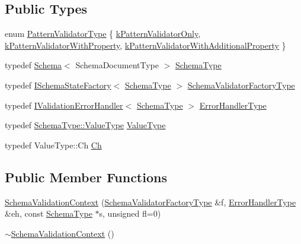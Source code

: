 \subsection*{Public Types}
\begin{DoxyCompactItemize}
\item 
enum \hyperlink{structinternal_1_1SchemaValidationContext_a4fb1b8fe7ecb9d4608e6b0ac0716826c}{Pattern\+Validator\+Type} \{ \hyperlink{structinternal_1_1SchemaValidationContext_a4fb1b8fe7ecb9d4608e6b0ac0716826ca54cca82af0ef391404c2a930187ce5e9}{k\+Pattern\+Validator\+Only}, 
\hyperlink{structinternal_1_1SchemaValidationContext_a4fb1b8fe7ecb9d4608e6b0ac0716826ca2514cf806ce8e41993907d57d3732435}{k\+Pattern\+Validator\+With\+Property}, 
\hyperlink{structinternal_1_1SchemaValidationContext_a4fb1b8fe7ecb9d4608e6b0ac0716826ca39a21b8fcd048ddaabe29bc11e08c8f8}{k\+Pattern\+Validator\+With\+Additional\+Property}
 \}
\item 
typedef \hyperlink{classinternal_1_1Schema}{Schema}$<$ Schema\+Document\+Type $>$ \hyperlink{structinternal_1_1SchemaValidationContext_a79b155ab3711b97b6e33ced450614397}{Schema\+Type}
\item 
typedef \hyperlink{classinternal_1_1ISchemaStateFactory}{I\+Schema\+State\+Factory}$<$ \hyperlink{structinternal_1_1SchemaValidationContext_a79b155ab3711b97b6e33ced450614397}{Schema\+Type} $>$ \hyperlink{structinternal_1_1SchemaValidationContext_a33fa91fd8e880d1adb9b891fe441f110}{Schema\+Validator\+Factory\+Type}
\item 
typedef \hyperlink{classinternal_1_1IValidationErrorHandler}{I\+Validation\+Error\+Handler}$<$ \hyperlink{structinternal_1_1SchemaValidationContext_a79b155ab3711b97b6e33ced450614397}{Schema\+Type} $>$ \hyperlink{structinternal_1_1SchemaValidationContext_a4d015d68e8957c254b84af5f3550b2f3}{Error\+Handler\+Type}
\item 
typedef \hyperlink{classinternal_1_1Schema_a8976b6d7e2a885483d0b51d941019340}{Schema\+Type\+::\+Value\+Type} \hyperlink{structinternal_1_1SchemaValidationContext_acc134e808d3a4dbe8834eb1a3e98e816}{Value\+Type}
\item 
typedef Value\+Type\+::\+Ch \hyperlink{structinternal_1_1SchemaValidationContext_abd905cd1513b117f1db68b58d6c41daf}{Ch}
\end{DoxyCompactItemize}
\subsection*{Public Member Functions}
\begin{DoxyCompactItemize}
\item 
\hyperlink{structinternal_1_1SchemaValidationContext_a7cd2919222200080a8700efc34d4ee3c}{Schema\+Validation\+Context} (\hyperlink{structinternal_1_1SchemaValidationContext_a33fa91fd8e880d1adb9b891fe441f110}{Schema\+Validator\+Factory\+Type} \&f, \hyperlink{structinternal_1_1SchemaValidationContext_a4d015d68e8957c254b84af5f3550b2f3}{Error\+Handler\+Type} \&eh, const \hyperlink{structinternal_1_1SchemaValidationContext_a79b155ab3711b97b6e33ced450614397}{Schema\+Type} $\ast$s, unsigned fl=0)
\item 
\hyperlink{structinternal_1_1SchemaValidationContext_abd287930e1134fe74e3e92580e51e97b}{$\sim$\+Schema\+Validation\+Context} ()
\end{DoxyCompactItemize}
